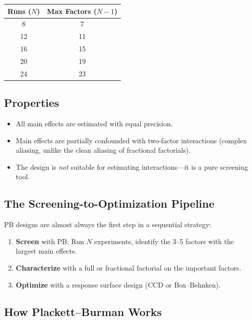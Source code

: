 \documentclass[11pt]{book}
\begin{document}
\begin{center}
\begin{tabular}{cc}
\toprule
Runs ($N$) & Max Factors ($N-1$) \\
\midrule
8 & 7 \\
12 & 11 \\
16 & 15 \\
20 & 19 \\
24 & 23 \\
\bottomrule
\end{tabular}
\end{center}

\subsection{Properties}

\begin{itemize}[nosep]
\item All main effects are estimated with equal precision.
\item Main effects are partially confounded with two-factor interactions (complex
      aliasing, unlike the clean aliasing of fractional factorials).
\item The design is \emph{not} suitable for estimating interactions---it is a pure
      screening tool.
\end{itemize}

\subsection{The Screening-to-Optimization Pipeline}

PB designs are almost always the first step in a sequential strategy:

\begin{enumerate}[nosep]
\item \textbf{Screen} with PB: Run $N$ experiments, identify the 3--5 factors with
      the largest main effects.
\item \textbf{Characterize} with a full or fractional factorial on the important
      factors.
\item \textbf{Optimize} with a response surface design (CCD or Box--Behnken).
\end{enumerate}


\subsection{How Plackett--Burman Works}
\end{document}
